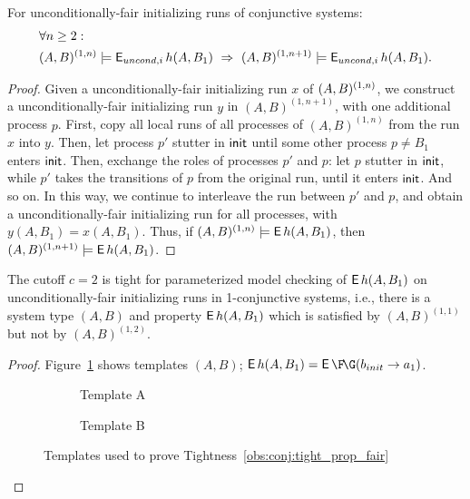 \begin{lemma} \label{le:ConjMonFair}
For unconditionally-fair initializing runs of conjunctive systems:
\begin{align*}
& \forall n \ge 2:\\
& (A,B)^{(1,n)} \models \operatorname{\mathsf{E}}_{uncond,i} h(A,B_1)
\ \Rightarrow \
(A,B)^{(1,n+1)} \models \operatorname{\mathsf{E}}_{uncond,i} h(A,B_1).
\end{align*}
\end{lemma}
\begin{proof}
Given a unconditionally-fair initializing run $x$ of $(A,B)^{(1,n)}$, we construct a unconditionally-fair initializing run $y$ in $(A,B)^{(1,n+1)}$, with one additional process $p$. 
First, copy all local runs of all processes of $(A,B)^{(1,n)}$ from the run $x$ into $y$.
Then, let process $p'$ stutter in ${\sf init}$ until some other process $p \neq B_1$ enters ${\sf init}$. 
Then, exchange the roles of processes $p'$ and $p$: let $p$ stutter in ${\sf init}$, while $p'$ takes the transitions of $p$ from the original run, until it enters ${\sf init}$. And so on.
In this way, we continue to interleave the run between $p'$ and $p$, and obtain a unconditionally-fair initializing run for all processes, with $y(A,B_1)=x(A,B_1)$. 
Thus, if $(A,B)^{(1,n)} \models \operatorname{\mathsf{E}} h(A,B_1)$, then $(A,B)^{(1,n+1)} \models \operatorname{\mathsf{E}} h(A,B_1)$.
\end{proof}


\begin{tightness} \label{obs:conj:tight_prop_fair}
The cutoff $c=2$ is tight for parameterized model checking of $\operatorname{\mathsf{E}} h(A,B_1)$ 
on unconditionally-fair initializing runs in 1-conjunctive systems, 
i.e., 
there is a system type $(A,B)$ and property $\operatorname{\mathsf{E}} h(A,B_1)$ 
which is satisfied by $(A,B)^{(1,1)}$ but not by $(A,B)^{(1,2)}$.
\end{tightness}
\begin{proof}
Figure~\ref{fig:obs:conj:tight_prop_fair} shows templates $(A,B)$;
$\pexists h(A,B_1) = \pexists \FG (b_{init} \impl a_1)$.
\begin{figure}[tb]
\centering
\begin{subfigure}[b]{0.45\textwidth}\center
\scalebox{0.75}{}
\caption*{Template A}
\end{subfigure}
\begin{subfigure}[b]{0.45\textwidth}\center
\scalebox{0.75}{}
\caption*{Template B}
\end{subfigure}
\caption{Templates used to prove Tightness~\ref{obs:conj:tight_prop_fair}}
\label{fig:obs:conj:tight_prop_fair}
\end{figure}
\end{proof}


